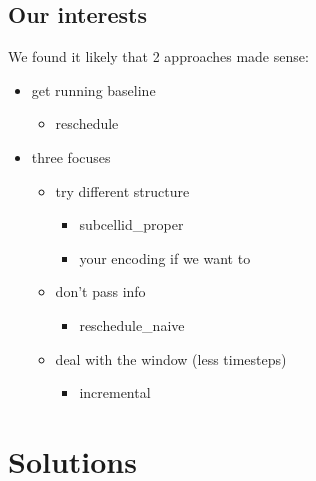 \documentclass{llncs}
\begin{document}
\subsection{Our interests}
We found it likely that 2 approaches made sense:
\color{green}
\begin{itemize}
	\item get running baseline 
	\begin{itemize}
		\item reschedule
	\end{itemize}
	\item three focuses
	\begin{itemize}
		\item try different structure
		\begin{itemize}
			\item subcellid\_proper
			\item your encoding if we want to
		\end{itemize}
		\item don't pass info
		\begin{itemize}
			\item reschedule\_naive
		\end{itemize}
		\item deal with the window (less timesteps)
		\begin{itemize}
			\item incremental
		\end{itemize}
	\end{itemize}
\end{itemize}
\color{black}


\section{Solutions}
\color{green}
\end{document}
